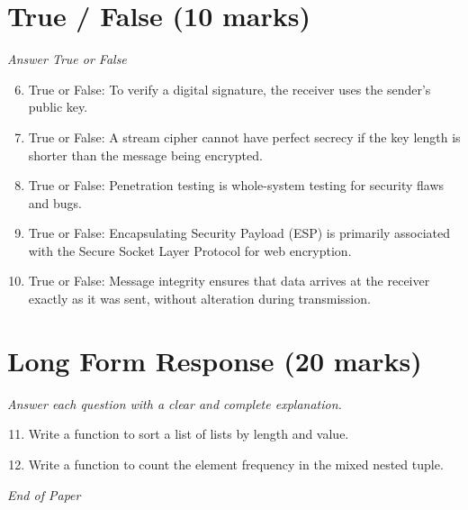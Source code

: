 \documentclass[12pt]{article}
\begin{document}
\section*{True / False (10 marks)}
\textit{Answer True or False}
\begin{enumerate}[label=\arabic*.]
\setcounter{enumi}{5}
\item True or False: To verify a digital signature, the receiver uses the sender's public key.
\item True or False: A stream cipher cannot have perfect secrecy if the key length is shorter than the message being encrypted.
\item True or False: Penetration testing is whole-system testing for security flaws and bugs.
\item True or False: Encapsulating Security Payload (ESP) is primarily associated with the Secure Socket Layer Protocol for web encryption.
\item True or False: Message integrity ensures that data arrives at the receiver exactly as it was sent, without alteration during transmission.
\end{enumerate}

\section*{Long Form Response (20 marks)}
\textit{Answer each question with a clear and complete explanation.}
\begin{enumerate}[label=\arabic*.]
\setcounter{enumi}{10}
\item Write a function to sort a list of lists by length and value.
\item Write a function to count the element frequency in the mixed nested tuple.
\end{enumerate}

\vfill
\noindent\textit{End of Paper}
\end{document}
